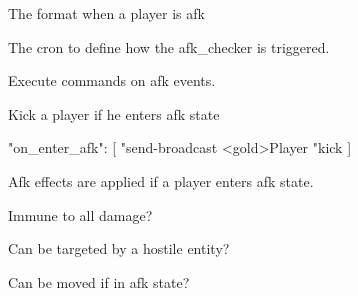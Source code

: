 \begin{Configuration}
    \item[format]{The  format when a player is afk}

    \item[afk\_checker]{
        \begin{NestedList}
            \item[]
            \item[cron]{The cron to define how the afk\_checker is triggered.}
        \end{NestedList}

    }

    \item[afk\_event]{
        Execute commands on afk events.
        \begin{example}{Kick a player if he enters afk state}
            \begin{jsoncode}
                "on_enter_afk": [
                "send-broadcast <gold>Player %
                "kick %
                ]
            \end{jsoncode}
        \end{example}
    }


    \item[event]{
        Afk effects are applied if a player enters afk state.

        \begin{NestedList}
            \item[invulnerable]{
                Immune to all damage?
            }

            \item[targetable]{
                Can be targeted by a hostile entity?
            }

            \item[moveable]{
                Can be moved if in afk state?
            }

        \end{NestedList}
    }

\end{Configuration}













